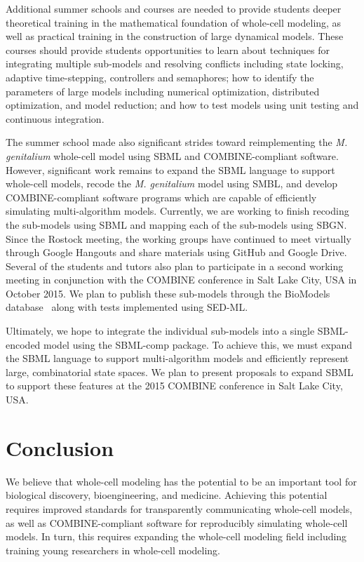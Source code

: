 \documentclass[journal,transmag]{IEEEtran}
\begin{document}
Additional summer schools and courses are needed to provide students deeper theoretical training in the mathematical foundation of whole-cell modeling, as well as practical training in the construction of large dynamical models. These courses should provide students opportunities to learn about techniques for integrating multiple sub-models and resolving conflicts including state locking, adaptive time-stepping, controllers and semaphores; how to identify the parameters of large models including numerical optimization, distributed optimization, and model reduction; and how to test models using unit testing and continuous integration. 

The summer school made also significant strides toward reimplementing the \textit{M. genitalium} whole-cell model using SBML and COMBINE-compliant software. However, significant work remains to expand the SBML language to support whole-cell models, recode the \textit{M. genitalium} model using SMBL, and develop COMBINE-compliant software programs which are capable of efficiently simulating multi-algorithm models. Currently, we are working to finish recoding the sub-models using SBML and mapping each of the sub-models using SBGN. Since the Rostock meeting, the working groups have continued to meet virtually through Google Hangouts and share materials using GitHub and Google Drive. Several of the students and tutors also plan to participate in a second working meeting in conjunction with the COMBINE conference in Salt Lake City, USA in October 2015. We plan to publish these sub-models through the BioModels database~\cite{li2010biomodels} along with tests implemented using SED-ML. 

Ultimately, we hope to integrate the individual sub-models into a single SBML-encoded model using the SBML-comp package. To achieve this, we must expand the SBML language to support multi-algorithm models and efficiently represent large, combinatorial state spaces. We plan to present proposals to expand SBML to support these features at the 2015 COMBINE conference in Salt Lake City, USA.

\section{Conclusion}
We believe that whole-cell modeling has the potential to be an important tool for biological discovery, bioengineering, and medicine.
Achieving this potential requires improved standards for transparently communicating whole-cell models, as well as COMBINE-compliant software for reproducibly simulating whole-cell models.
In turn, this requires expanding the whole-cell modeling field including training young researchers in whole-cell modeling.
\end{document}
